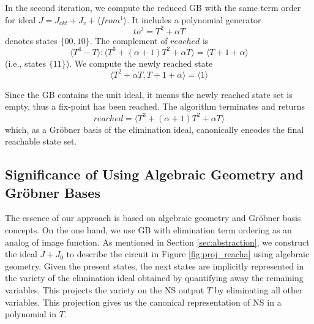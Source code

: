 \begin{Example}
In the second iteration, we compute the reduced GB with the same term
order for ideal $J = J_{ckt}+J_v+\langle from^1\rangle$. 
It includes a polynomial generator $$to^2 = T^2+\alpha T$$ denotes states
$\{00,10\}$. The complement of $reached$ is $$\langle T^4-T\rangle:\langle T^3+(\alpha+1)T^2+\alpha T\rangle
= \langle T + 1+\alpha\rangle$$ (i.e., states $\{11\}$). We compute the newly reached state 
$$\langle T^2+\alpha T, T+1+\alpha \rangle = \langle 1\rangle$$ 

Since the GB contains the unit ideal, it means the newly reached state
set is empty, thus a fix-point has been reached. The algorithm
terminates and returns $$reached = \langle T^3+(\alpha+1)T^2+\alpha
T\rangle$$ which, as a Gr\"obner basis of the elimination ideal,
canonically encodes the final reachable state set. 
\end{Example}


\subsection{Significance of Using Algebraic Geometry and Gr\"obner Bases}
The essence of our approach is based on algebraic geometry and Gr\"obner basis concepts.
On the one hand, we use GB with elimination term ordering as an analog of image function.
As mentioned in Section \ref{sec:abstraction}, we construct the ideal $J+J_0$ to 
describe the circuit in Figure \ref{fig:proj_reacha} using algebraic geometry.
Given the present states, the next states are implicitly represented in the variety of 
the elimination ideal obtained by quantifying away the remaining variables. 
This projects the variety on the NS output $T$ by eliminating all other variables.
This projection gives us the canonical representation of NS in a polynomial in $T$.

